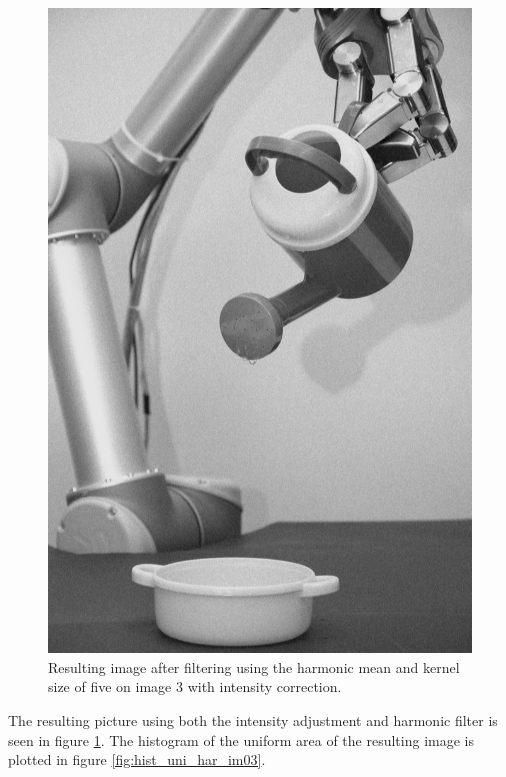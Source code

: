 \begin{figure}[H]
\centering
\includegraphics[width= 0.9 \linewidth]{../code/images/image_harmonic_03}
\caption{Resulting image after filtering using the harmonic mean and kernel size of five on image 3 with intensity correction.}
\label{fig:img_result_im03}
\end{figure}


The resulting picture using both the intensity adjustment and harmonic filter is seen in figure \ref{fig:img_result_im03}.
The histogram of the uniform area of the resulting image is plotted in figure  \ref{fig:hist_uni_har_im03}.



